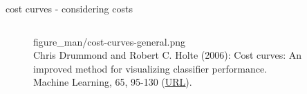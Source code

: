 \begin{vbframe}{cost curves - considering costs}
\begin{columns}[T]
\begin{column}{0.5\textwidth}
\begin{figure}
{    {figure_man/cost-curves-general.png}}
  \tiny
  \\Chris Drummond and Robert C. Holte (2006): Cost curves: An improved
  method for visualizing classifier performance. \\Machine Learning, 65, 95-130
  (\href{https://www.semanticscholar.org/paper/Cost-curves\%3A-An-improved-method-for  -visualizing-Drummond-Holte/71708ce984e0896e7383435913547e770572410e}
  {\underline{URL}}).
\end{figure}
\end{column}
\end{columns}
\end{vbframe}


